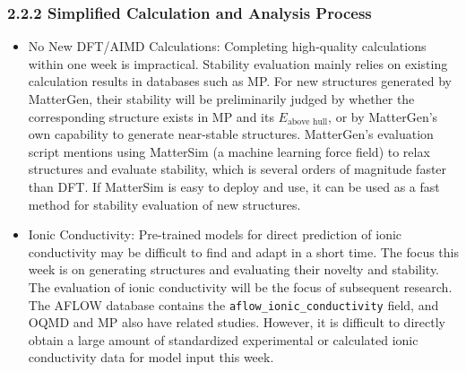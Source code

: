 \documentclass[letterpaper]{article} %
\begin{document}
\subsubsection{2.2.2 Simplified Calculation and Analysis Process}
\begin{itemize}
    \item No New DFT/AIMD Calculations: Completing high-quality calculations within one week is impractical. Stability evaluation mainly relies on existing calculation results in databases such as MP. For new structures generated by MatterGen, their stability will be preliminarily judged by whether the corresponding structure exists in MP and its $E_{\text{above hull}}$, or by MatterGen's own capability to generate near-stable structures. MatterGen's evaluation script mentions using MatterSim (a machine learning force field) to relax structures and evaluate stability, which is several orders of magnitude faster than DFT. If MatterSim is easy to deploy and use, it can be used as a fast method for stability evaluation of new structures.
    \item Ionic Conductivity: Pre-trained models for direct prediction of ionic conductivity may be difficult to find and adapt in a short time. The focus this week is on generating structures and evaluating their novelty and stability. The evaluation of ionic conductivity will be the focus of subsequent research. The AFLOW database contains the \texttt{aflow\_ionic\_conductivity} field, and OQMD and MP also have related studies. However, it is difficult to directly obtain a large amount of standardized experimental or calculated ionic conductivity data for model input this week.
\end{itemize}

\end{document}
